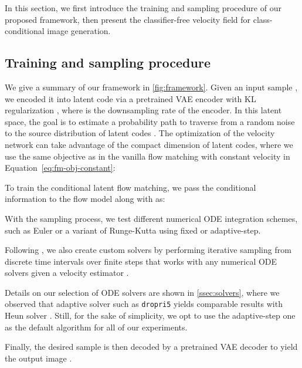 \documentclass{article}
\theoremstyle{plain}
\theoremstyle{definition}
\theoremstyle{remark}
\begin{document}
In this section, we first introduce the training and sampling procedure of our proposed framework, then present the classifier-free velocity field for class-conditional image generation.

\subsection{Training and sampling procedure}
We give a summary of our framework in \cref{fig:framework}.
Given an input sample , we encoded it into latent code  via a pretrained VAE encoder with KL regularization \cite{kingma2013auto}, where  is the downsampling rate of the encoder.
In this latent space, the goal is to estimate a probability path to traverse from a random noise  to the source distribution of latent codes .
The optimization of the velocity network can take advantage of the compact dimension of latent codes, where we use the same objective as in the vanilla flow matching with constant velocity in Equation~\cref{eq:fm-obj-constant}:



To train the conditional latent flow matching, we pass the conditional information  to the flow model along with  as:



With the sampling process, we test different numerical ODE integration schemes, such as Euler or a variant of Runge-Kutta using fixed or adaptive-step.

Following \cite{karras2022elucidating}, we also create custom solvers by performing iterative sampling from discrete time intervals  over  finite steps that works with any numerical ODE solvers given a velocity estimator .

Details on our selection of ODE solvers are shown in \cref{ssec:solvers}, where we observed that adaptive solver such as \texttt{dropri5} \cite{Dormand1980AFO} yields comparable results with Heun solver \cite{zheng2023eds}. Still, for the sake of simplicity, we opt to use the adaptive-step one as the default algorithm for all of our experiments.

Finally, the desired sample  is then decoded by a pretrained VAE decoder  to yield the output image .
\end{document}

